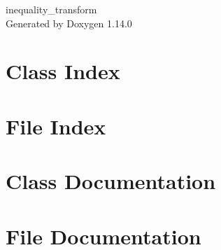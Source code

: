 \documentclass[twoside]{book}
\newcommand{\+}{\discretionary{\mbox{\scriptsize$\hookleftarrow$}}{}{}}
\newcommand{\clearemptydoublepage}{%
    \newpage{\pagestyle{empty}\cleardoublepage}%
  }
\begin{document}
  \raggedbottom
    \hypersetup{pageanchor=false,
                bookmarksnumbered=true,
                pdfencoding=unicode
               }
  \begin{titlepage}
  \vspace*{7cm}
  \begin{center}%
  {\Large inequality\+\_\+transform}\\
  \vspace*{1cm}
  {\large Generated by Doxygen 1.14.0}\\
  \end{center}
  \end{titlepage}
  \clearemptydoublepage
  \tableofcontents
  \clearemptydoublepage
  \hypersetup{pageanchor=true}
\chapter{Class Index}

\chapter{File Index}

\chapter{Class Documentation}


\chapter{File Documentation}






  \backmatter
  \newpage
  \clearemptydoublepage
  \printindex
\end{document}
